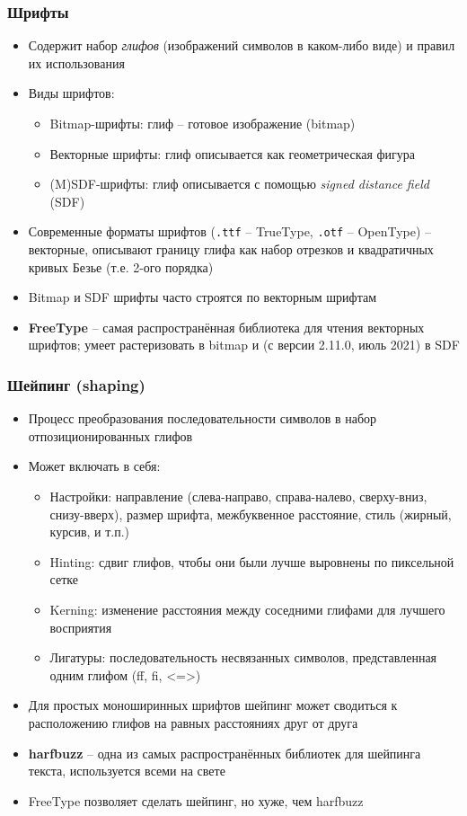 \documentclass{beamer}
\begin{document}
\begin{frame}[fragile]
\frametitle{Шрифты}
\begin{itemize}
\item Содержит набор \textit{глифов} (изображений символов в каком-либо виде) и правил их использования
\pause
\item Виды шрифтов:
\pause
\begin{itemize}
\item Bitmap-шрифты: глиф -- готовое изображение (bitmap)
\pause
\item Векторные шрифты: глиф описывается как геометрическая фигура
\pause
\item (M)SDF-шрифты: глиф описывается с помощью \textit{signed distance field} (SDF)
\end{itemize}
\pause
\item Современные форматы шрифтов (\verb|.ttf| -- TrueType, \verb|.otf| -- OpenType) -- векторные, описывают границу глифа как набор отрезков и квадратичных кривых Безье (т.е. 2-ого порядка)
\pause
\item Bitmap и SDF шрифты часто строятся по векторным шрифтам
\pause
\item \textbf{FreeType} -- самая распространённая библиотека для чтения векторных шрифтов; умеет растеризовать в bitmap и (с версии 2.11.0, июль 2021) в SDF
\end{itemize}
\end{frame}

\begin{frame}[fragile]
\frametitle{Шейпинг (shaping)}
\begin{itemize}
\item Процесс преобразования последовательности символов в набор отпозиционированных глифов
\pause
\item Может включать в себя:
\pause
\begin{itemize}
\item Настройки: направление (слева-направо, справа-налево, сверху-вниз, снизу-вверх), размер шрифта, межбуквенное расстояние, стиль (жирный, курсив, и т.п.)
\pause
\item Hinting: сдвиг глифов, чтобы они были лучше выровнены по пиксельной сетке
\pause
\item Kerning: изменение расстояния между соседними глифами для лучшего восприятия
\pause
\item Лигатуры: последовательность несвязанных символов, представленная одним глифом (ff, fi, <=>)
\end{itemize}
\pause
\item Для простых моноширинных шрифтов шейпинг может сводиться к расположению глифов на равных расстояниях друг от друга
\pause
\item \textbf{harfbuzz} -- одна из самых распространённых библиотек для шейпинга текста, используется всеми на свете
\item FreeType позволяет сделать шейпинг, но хуже, чем harfbuzz
\end{itemize}
\end{frame}
\end{document}
